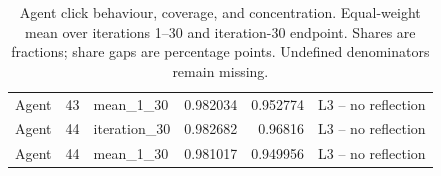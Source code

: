 \begin{table}[htbp!]
\begin{tabular}{lrlrrl}
Agent & 43 & mean\_1\_30 & 0.982034 & 0.952774 & L3 -- no reflection \\
Agent & 44 & iteration\_30 & 0.982682 & 0.96816 & L3 -- no reflection \\
Agent & 44 & mean\_1\_30 & 0.981017 & 0.949956 & L3 -- no reflection \\
\hline
\end{tabular}
\caption{Agent click behaviour, coverage, and concentration. Equal-weight mean over iterations 1--30 and iteration-30 endpoint. Shares are fractions; share gaps are percentage points. Undefined denominators remain missing.}
\label{chap:results:tab:rq3_agents_concentration}
\end{table}
